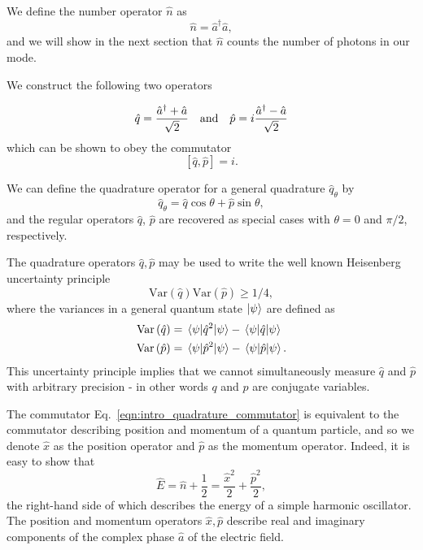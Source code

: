 We define the number operator $\hat{n}$ as 
\begin{equation}
\hat{n} = \hat{a}^\dagger \hat{a},
\end{equation}
and we will show in the next section that $\hat{n}$ counts the number of photons in our mode.

We construct the following two operators

\begin{equation}
\hat{q} = \frac{\hat{a}^\dagger + \hat{a}}{\sqrt{2}} \qq{and} \hat{p} = i \frac{\hat{a}^\dagger - \hat{a}}{\sqrt{2}}
\end{equation}
which can be shown to obey the commutator
\begin{equation}\label{eqn:intro_quadrature_commutator}
\left[\hat{q}, \hat{p}\right] = i.
\end{equation}

\noindent We can define the quadrature operator for a general quadrature $\hat{q}_\theta$ by
\begin{equation}
\hat{q}_\theta = \hat{q} \cos\theta  + \hat{p} \sin\theta ,
\end{equation}
and the regular operators $\hat{q}$, $\hat{p}$ are recovered as special cases with $\theta = 0$ and $\pi/2$, respectively.


\noindent The quadrature operators $\hat{q}, \hat{p}$ may be used to write the well known Heisenberg uncertainty principle 
\begin{equation}
\text{Var}\left(\hat{q}\right)\text{Var}\left(\hat{p}\right) \ge 1/4, %
\end{equation} 
where the variances in a general quantum state $\ket{\psi}$ are defined as
\begin{align}
\text{Var}\left(\hat{q}\right) &= \mel{\psi}{\hat{q}^2}{\psi} - \mel{\psi}{\hat{q}}{\psi} \notag \\
\text{Var}\left(\hat{p}\right) &= \mel{\psi}{\hat{p}^2}{\psi} - \mel{\psi}{\hat{p}}{\psi}.
\end{align}
This uncertainty principle implies that we cannot simultaneously measure $\hat{q}$ and $\hat{p}$ with arbitrary precision - in other words $q$ and $p$ are conjugate variables.


\noindent The commutator Eq.~\ref{eqn:intro_quadrature_commutator} is equivalent to the commutator describing position and momentum of a quantum particle, and so we denote $\hat{x}$ as the position operator and $\hat{p}$ as the momentum operator. Indeed, it is easy to show that
\begin{equation}
\hat{E} = \hat{n} + \frac{1}{2} = \frac{\hat{x}^2}{2} + \frac{\hat{p}^2}{2},
\end{equation}
the right-hand side of which describes the energy of a simple harmonic oscillator. The position and momentum operators $\hat{x}, \hat{p}$ describe real and imaginary components of the complex phase $\hat{a}$ of the electric field.



